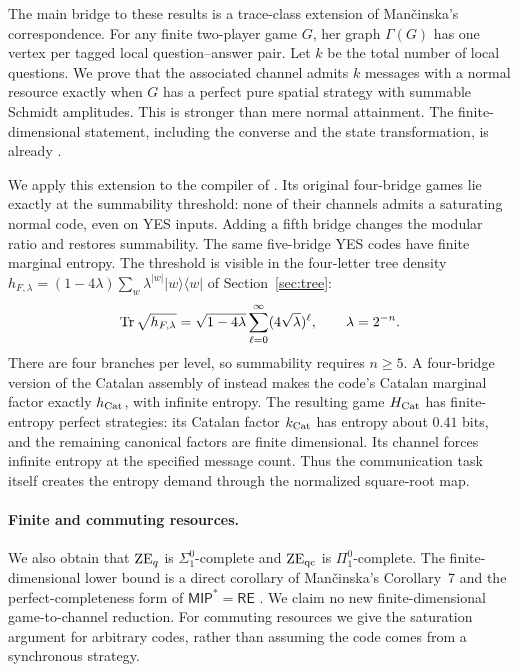The main bridge to these results is a trace-class extension of Man\v{c}inska's correspondence. For any finite two-player game $G$, her graph $\Gamma(G)$ has one vertex per tagged local question--answer pair. Let $k$ be the total number of local questions. We prove that the associated channel admits $k$ messages with a normal resource exactly when $G$ has a perfect pure spatial strategy with summable Schmidt amplitudes. This is stronger than mere normal attainment. The finite-dimensional statement, including the converse and the state transformation, is already \cite[Theorem~6]{Mancinska}.

We apply this extension to the compiler of \cite{Sigma2}. Its original four-bridge games lie exactly at the summability threshold: none of their channels admits a saturating normal code, even on YES inputs. Adding a fifth bridge changes the modular ratio and restores summability. The same five-bridge YES codes have finite marginal entropy. The threshold is visible in the four-letter tree density $h_{F,\lambda}=(1-4\lambda)\sum_w\lambda^{|w|}|w\rangle\langle w|$ of Section~\ref{sec:tree}:
\[
 \operatorname{Tr}\sqrt{h_{F,\lambda}}
 =\sqrt{1-4\lambda}\sum_{\ell=0}^{\infty}(4\sqrt\lambda)^\ell,
 \qquad \lambda=2^{-n}.
\]
There are four branches per level, so summability requires $n\geq5$.
A four-bridge version of the Catalan assembly of \cite{Entropy} instead makes the code's Catalan marginal factor exactly $h_{\mathrm{Cat}}$, with infinite entropy. The resulting game $H_{\mathrm{Cat}}$ has finite-entropy perfect strategies: its Catalan factor $k_{\mathrm{Cat}}$ has entropy about $0.41$ bits, and the remaining canonical factors are finite dimensional. Its channel forces infinite entropy at the specified message count. Thus the communication task itself creates the entropy demand through the normalized square-root map.

\paragraph{Finite and commuting resources.}
We also obtain that $\mathrm{ZE}_q$ is $\Sigma^0_1$-complete and $\mathrm{ZE}_{\mathrm{qc}}$ is $\Pi^0_1$-complete. The finite-dimensional lower bound is a direct corollary of Man\v{c}inska's Corollary~7 and the perfect-completeness form of $\mathsf{MIP}^*=\mathsf{RE}$ \cite{Mancinska,MIPRE}. We claim no new finite-dimensional game-to-channel reduction. For commuting resources we give the saturation argument for arbitrary codes, rather than assuming the code comes from a synchronous strategy.

